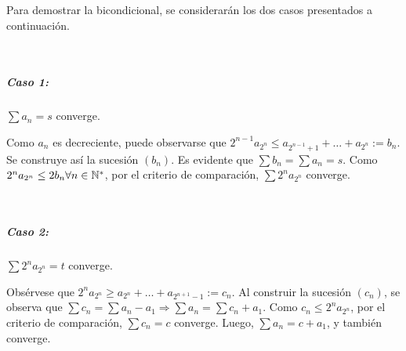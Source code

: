 
Para demostrar la bicondicional, se considerarán los dos casos presentados a continuación.

~\subparagraph{Caso 1:} $\sum a_n = s$ converge.

	Como $a_n$ es decreciente, puede observarse que $2^{n-1} a_{2^n} \leq a_{2^{n-1}+1} + \ldots + a_{2^n} := b_n$. Se construye así la sucesión $(b_n)$. Es evidente que $\sum b_n = \sum a_n = s$. Como $2^na_{2^n} \leq 2b_n \forall n\in\mathbb{N}^*$, por el criterio de comparación, $\sum 2^na_{2^n}$ converge.

~\subparagraph{Caso 2:} $\sum 2^na_{2^n} = t$ converge.

	Obsérvese que $2^na_{2^n} \geq a_{2^n} + \ldots + a_{2^{n+1}-1} := c_n$.
	Al construir la sucesión $(c_n)$, se observa que $\sum c_n = \sum a_n - a_1 \Rightarrow \sum a_n = \sum c_n + a_1$.
	Como $c_n \leq 2^na_{2^n}$, por el criterio de comparación, $\sum c_n = c$ converge. Luego, $\sum a_n = c + a_1$, y también converge.